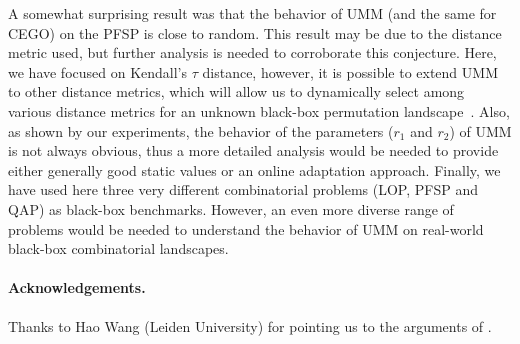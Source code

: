 \documentclass[runningheads]{llncs}
\begin{document}
A somewhat surprising result was that the behavior of UMM (and the same for
CEGO) on the PFSP is close to random. This result may be due to the distance
metric used, but further analysis is needed to corroborate this
conjecture. Here, we have focused on Kendall's $\tau$ distance, however, it is
possible to extend UMM to other distance metrics, which will allow us to
dynamically select among various distance metrics for an unknown black-box 
permutation landscape~\citep{ZaeStoBar2014:ppsn}. Also, as shown by our
experiments, the behavior of the parameters ($r_1$ and $r_2$) of UMM is not
always obvious, thus a more detailed analysis would be needed to provide either
generally good static values or an online adaptation approach. Finally, we have
used here three very different combinatorial problems (LOP, PFSP and QAP) as
black-box benchmarks. However, an even more diverse range of problems would be
needed to understand the behavior of UMM on real-world black-box combinatorial
landscapes. 



\begin{smaller}
\paragraph*{Acknowledgements.}
%
Thanks to Hao Wang (Leiden University) for pointing us to the arguments of
\citet{EriPeaGar2019scalable}.
\end{smaller}



\renewcommand{\doi}[1]{doi:\hspace{.16667em plus .08333em}\discretionary{}{}{}\href{https://doi.org/#1}{\urlstyle{rm}\nolinkurl{#1}}}


\end{document}
